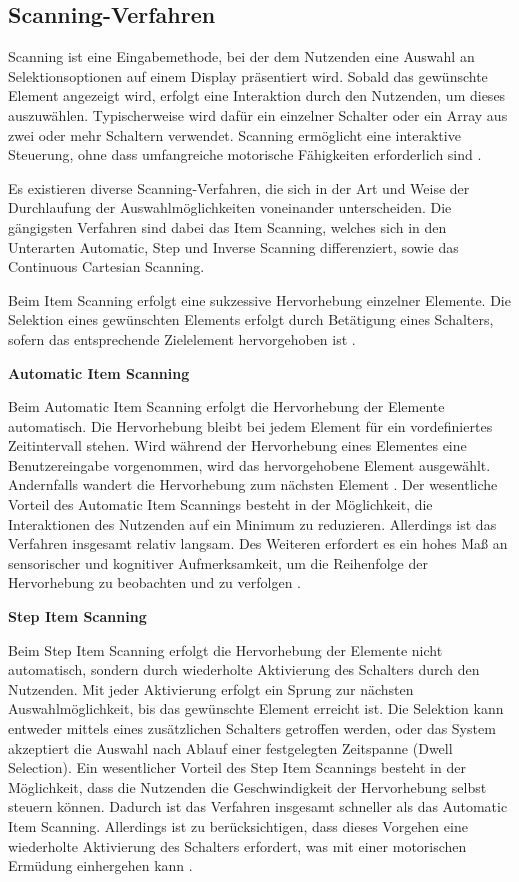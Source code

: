 \subsection{Scanning-Verfahren}
\label{subchap:Scanning}
Scanning ist eine Eingabemethode, bei der dem Nutzenden eine Auswahl an Selektionsoptionen auf einem Display präsentiert wird. Sobald das gewünschte Element angezeigt wird, erfolgt eine Interaktion durch den Nutzenden, um dieses auszuwählen. Typischerweise wird dafür ein einzelner Schalter oder ein Array aus zwei oder mehr Schaltern verwendet. Scanning ermöglicht eine interaktive Steuerung, ohne dass umfangreiche motorische Fähigkeiten erforderlich sind \citep{COOK2015117}.

Es existieren diverse Scanning-Verfahren, die sich in der Art und Weise der Durchlaufung der Auswahlmöglichkeiten voneinander unterscheiden. Die gängigsten Verfahren sind dabei das Item Scanning, welches sich in den Unterarten Automatic, Step und Inverse Scanning differenziert, sowie das Continuous Cartesian Scanning.

Beim Item Scanning erfolgt eine sukzessive Hervorhebung einzelner Elemente. Die Selektion eines gewünschten Elements erfolgt durch Betätigung eines Schalters, sofern das entsprechende Zielelement hervorgehoben ist \citep{10.1145/772047.772049}. 

{\normalfont \bfseries Automatic Item Scanning} 

Beim Automatic Item Scanning erfolgt die Hervorhebung der Elemente automatisch. Die Hervorhebung bleibt bei jedem Element für ein vordefiniertes Zeitintervall stehen. Wird während der Hervorhebung eines Elementes eine Benutzereingabe vorgenommen, wird das hervorgehobene Element ausgewählt. Andernfalls wandert die Hervorhebung zum nächsten Element \citep{10.1145/772047.772049}.
Der wesentliche Vorteil des Automatic Item Scannings besteht in der Möglichkeit, die Interaktionen des Nutzenden auf ein Minimum zu reduzieren. Allerdings ist das Verfahren insgesamt relativ langsam. Des Weiteren erfordert es ein hohes Maß an sensorischer und kognitiver Aufmerksamkeit, um die Reihenfolge der Hervorhebung zu beobachten und zu verfolgen \citep{COOK2015117}.

{\normalfont \bfseries Step Item Scanning} 

Beim Step Item Scanning erfolgt die Hervorhebung der Elemente nicht automatisch, sondern durch wiederholte Aktivierung des Schalters durch den Nutzenden. Mit jeder Aktivierung erfolgt ein Sprung zur nächsten Auswahlmöglichkeit, bis das gewünschte Element erreicht ist. Die Selektion kann entweder mittels eines zusätzlichen Schalters getroffen werden, oder das System akzeptiert die Auswahl nach Ablauf einer festgelegten Zeitspanne (Dwell Selection). Ein wesentlicher Vorteil des Step Item Scannings besteht in der Möglichkeit, dass die Nutzenden die Geschwindigkeit der Hervorhebung selbst steuern können. Dadurch ist das Verfahren insgesamt schneller als das Automatic Item Scanning.  Allerdings ist zu berücksichtigen, dass dieses Vorgehen eine wiederholte Aktivierung des Schalters erfordert, was mit einer motorischen Ermüdung einhergehen kann \citep{COOK2015117}.

